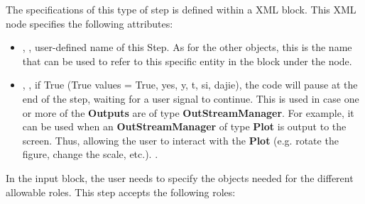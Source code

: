 The specifications of this type of step is defined within a 
 XML block.
%
This XML node specifies the following attributes:
\vspace{-5mm}
\begin{itemize}
\itemsep0em
\item {}, , user-defined name of
  this Step. 
  \nb As for the other objects, this is the name that can be used to refer to
  this specific entity in the  block under the 
   node.
\item {}, , if True
  (True values = True, yes, y, t, si, dajie), the code will pause at the end of
  the step, waiting for a user signal to continue. This is used in case one or
  more of the \textbf{Outputs} are of type \textbf{OutStreamManager}.
  For example, it can be used when an \textbf{OutStreamManager} of type
  \textbf{Plot} is output to the screen. Thus, allowing the user to interact
  with the \textbf{Plot} (e.g. rotate the figure, change the scale, etc.).
  .
\end{itemize}
\vspace{-5mm}
In the  input block, the user needs to specify the objects
needed for the different allowable roles.
%
This step accepts the following roles:
